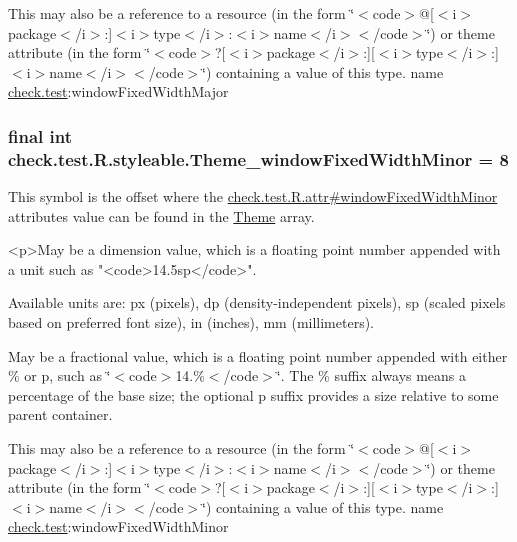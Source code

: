 This may also be a reference to a resource (in the form \char`\"{}$<$code$>$@\mbox{[}$<$i$>$package$<$/i$>$\+:\mbox{]}$<$i$>$type$<$/i$>$\+:$<$i$>$name$<$/i$>$$<$/code$>$\char`\"{}) or theme attribute (in the form \char`\"{}$<$code$>$?\mbox{[}$<$i$>$package$<$/i$>$\+:\mbox{]}\mbox{[}$<$i$>$type$<$/i$>$\+:\mbox{]}$<$i$>$name$<$/i$>$$<$/code$>$\char`\"{}) containing a value of this type.  name \hyperlink{namespacecheck_1_1test}{check.\+test}\+:window\+Fixed\+Width\+Major \hypertarget{classcheck_1_1test_1_1_r_1_1styleable_ad9f0c51f93dc1efedfd42524c8d2acea}{}
\subsubsection[{Theme\+\_\+window\+Fixed\+Width\+Minor}]{\setlength{\rightskip}{0pt plus 5cm}final int check.\+test.\+R.\+styleable.\+Theme\+\_\+window\+Fixed\+Width\+Minor = 8\hspace{0.3cm}{\ttfamily [static]}}\label{classcheck_1_1test_1_1_r_1_1styleable_ad9f0c51f93dc1efedfd42524c8d2acea}
This symbol is the offset where the \hyperlink{classcheck_1_1test_1_1_r_1_1attr_a7a67f15de710341d2d449dc94d1f781d}{check.\+test.\+R.\+attr\#window\+Fixed\+Width\+Minor} attribute\textquotesingle{}s value can be found in the \hyperlink{classcheck_1_1test_1_1_r_1_1styleable_acca726d02016a0cf607782ec3a436a81}{Theme} array.

\begin{DoxyVerb}      <p>May be a dimension value, which is a floating point number appended with a unit such as "<code>14.5sp</code>".
\end{DoxyVerb}
 Available units are\+: px (pixels), dp (density-\/independent pixels), sp (scaled pixels based on preferred font size), in (inches), mm (millimeters). 

May be a fractional value, which is a floating point number appended with either \% or p, such as \char`\"{}$<$code$>$14.\%$<$/code$>$\char`\"{}. The \% suffix always means a percentage of the base size; the optional p suffix provides a size relative to some parent container. 

This may also be a reference to a resource (in the form \char`\"{}$<$code$>$@\mbox{[}$<$i$>$package$<$/i$>$\+:\mbox{]}$<$i$>$type$<$/i$>$\+:$<$i$>$name$<$/i$>$$<$/code$>$\char`\"{}) or theme attribute (in the form \char`\"{}$<$code$>$?\mbox{[}$<$i$>$package$<$/i$>$\+:\mbox{]}\mbox{[}$<$i$>$type$<$/i$>$\+:\mbox{]}$<$i$>$name$<$/i$>$$<$/code$>$\char`\"{}) containing a value of this type.  name \hyperlink{namespacecheck_1_1test}{check.\+test}\+:window\+Fixed\+Width\+Minor \hypertarget{classcheck_1_1test_1_1_r_1_1styleable_affa53ed5805b4fc7b71d664cddc7b88e}{}
